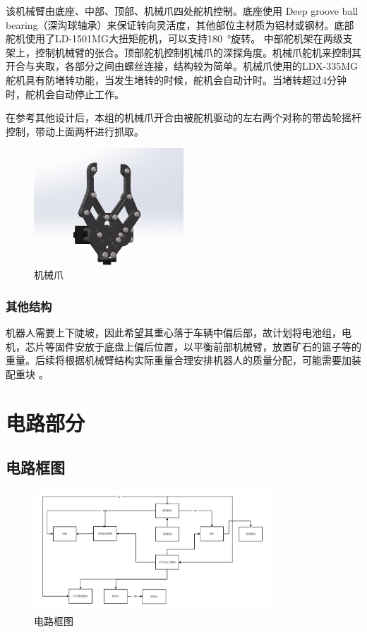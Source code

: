 \documentclass[10pt]{ctexart}
\begin{document}
\par
该机械臂由底座、中部、顶部、机械爪四处舵机控制。底座使用 Deep groove ball bearing（深沟球轴承）来保证转向灵活度，其他部位主材质为铝材或钢材。底部舵机使用了LD-1501MG大扭矩舵机，可以支持\SI{180}{\degree}旋转。
中部舵机架在两级支架上，控制机械臂的张合。顶部舵机控制机械爪的深探角度。机械爪舵机来控制其开合与夹取，各部分之间由螺丝连接，结构较为简单。机械爪使用的LDX-335MG舵机具有防堵转功能，当发生堵转的时候，舵机会自动计时。当堵转超过4分钟时，舵机会自动停止工作。
\par
在参考其他设计后，本组的机械爪开合由被舵机驱动的左右两个对称的带齿轮摇杆控制，带动上面两杆进行抓取。

\begin{figure}[H]
    \centering
    \includegraphics[width = 0.5\textwidth]{machinery/claw.png}
    \caption{机械爪}
    \label{fig:claw}
\end{figure}
\clearpage
\subsubsection{其他结构}
\par
机器人需要上下陡坡，因此希望其重心落于车辆中偏后部，故计划将电池组，电机，芯片等固件安放于底盘上偏后位置，以平衡前部机械臂，放置矿石的篮子等的重量。后续将根据机械臂结构实际重量合理安排机器人的质量分配，可能需要加装配重块 。

\clearpage
\section{电路部分}
\subsection{电路框图}
\begin{figure}[H]
    \centering
    \includegraphics[width = 0.8\textwidth]{circuit.png}
    \caption{电路框图}
    \label{fig:circuit}
\end{figure}
\end{document}
